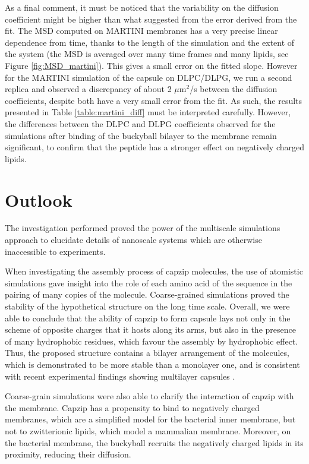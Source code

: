 As a final comment, it must be noticed that the variability on the diffusion coefficient might be higher than what suggested from the error derived from the fit. The MSD computed on MARTINI membranes has a very precise linear dependence from time, thanks to the length of the simulation and the extent of the system (the MSD is averaged over many time frames and many lipids, see Figure \ref{fig:MSD_martini}). This gives a small error on the fitted slope. However for the MARTINI simulation of the capsule on DLPC/DLPG, we run a second replica and observed a discrepancy of about 2 $\mu$m$^2$/s between the diffusion coefficients, despite both have a very small error from the fit.
%
As such, the results presented in Table \ref{table:martini_diff} must be interpreted carefully. However, the differences between the DLPC and DLPG coefficients observed for the simulations after binding of the buckyball bilayer to the membrane remain significant, to confirm that the peptide has a stronger effect on negatively charged lipids.


\section{Outlook}
The investigation performed proved the power of the multiscale simulations approach to elucidate details of nanoscale systems which are otherwise inaccessible to experiments.

When investigating the assembly process of capzip molecules, the use of atomistic simulations gave insight into the role of each amino acid of the sequence in the pairing of many copies of the molecule. Coarse-grained simulations proved the stability of the hypothetical structure on the long time scale. Overall, we were able to conclude that the ability of capzip to form capsule lays not only in the scheme of opposite charges that it hosts along its arms, but also in the presence of many hydrophobic residues, which favour the assembly by hydrophobic effect.
%
Thus, the proposed structure contains a bilayer arrangement of the molecules, which is demonstrated to be more stable than a monolayer one, and is consistent with recent experimental findings showing multilayer capsules \citep{Kepiro2019}.

Coarse-grain simulations were also able to clarify the interaction of capzip with the membrane. Capzip has a propensity to bind to negatively charged membranes, which are a simplified model for the bacterial inner membrane, but not to zwitterionic lipids, which model a mammalian membrane. Moreover, on the bacterial membrane, the buckyball recruits the negatively charged lipids in its proximity, reducing their diffusion.

